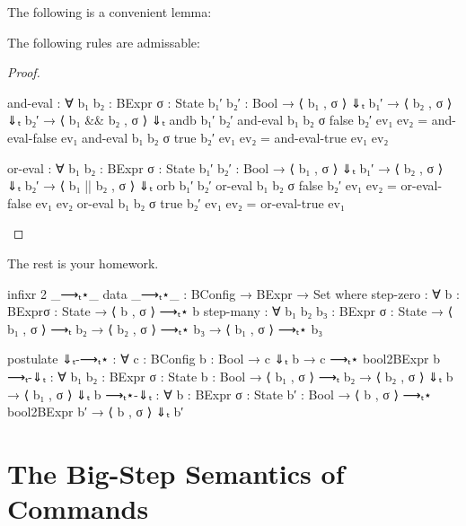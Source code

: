 \documentclass{lecturenotes}
\begin{document}
The following is a convenient lemma:
\begin{lem}
  The following rules are admissable:
\end{lem}
\begin{proof}
\begin{code}
and-eval : ∀ {b₁ b₂ : BExpr} {σ : State} {b₁′ b₂′ : Bool} →
  ⟨ b₁ , σ ⟩ ⇓ₜ b₁′ →
  ⟨ b₂ , σ ⟩ ⇓ₜ b₂′ →
  ⟨ b₁ && b₂ , σ ⟩ ⇓ₜ andb b₁′ b₂′
and-eval {b₁} {b₂} {σ} {false} {b₂′} ev₁ ev₂ = and-eval-false ev₁
and-eval {b₁} {b₂} {σ} {true} {b₂′} ev₁ ev₂ = and-eval-true ev₁ ev₂

or-eval : ∀ {b₁ b₂ : BExpr} {σ : State} {b₁′ b₂′ : Bool} →
  ⟨ b₁ , σ ⟩ ⇓ₜ b₁′ →
  ⟨ b₂ , σ ⟩ ⇓ₜ b₂′ →
  ⟨ b₁ || b₂ , σ ⟩ ⇓ₜ orb b₁′ b₂′
or-eval {b₁} {b₂} {σ} {false} {b₂′} ev₁ ev₂ = or-eval-false ev₁ ev₂
or-eval {b₁} {b₂} {σ} {true} {b₂′} ev₁ ev₂ = or-eval-true ev₁    
\end{code}
\end{proof}

The rest is your homework.

\begin{code}[hide]
infixr 2 _⟶ₜ⋆_
data _⟶ₜ⋆_ : BConfig → BExpr → Set where
  step-zero : ∀ {b : BExpr}{σ : State} → ⟨ b , σ ⟩ ⟶ₜ⋆ b
  step-many : ∀ {b₁ b₂ b₃ : BExpr} {σ : State} →
    ⟨ b₁ , σ ⟩ ⟶ₜ  b₂ →
    ⟨ b₂ , σ ⟩ ⟶ₜ⋆ b₃ →
    ⟨ b₁ , σ ⟩ ⟶ₜ⋆ b₃
  
postulate
 ⇓ₜ-⟶ₜ⋆ : ∀ {c : BConfig} {b : Bool} → c ⇓ₜ b → c ⟶ₜ⋆ bool2BExpr b
 ⟶ₜ-⇓ₜ : ∀ {b₁ b₂ : BExpr} {σ : State} {b : Bool} → ⟨ b₁ , σ ⟩ ⟶ₜ b₂ → ⟨ b₂ , σ ⟩ ⇓ₜ b → ⟨ b₁ , σ ⟩ ⇓ₜ b
 ⟶ₜ⋆-⇓ₜ : ∀ {b : BExpr} {σ : State} {b′ : Bool} → ⟨ b , σ ⟩ ⟶ₜ⋆ bool2BExpr b′ → ⟨ b , σ ⟩ ⇓ₜ b′
\end{code}

\section{The Big-Step Semantics of Commands}
\label{sec:big-step-semantics-com}
\end{document}

